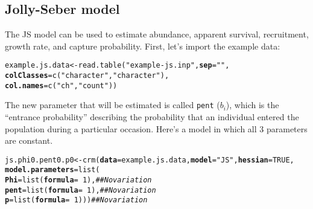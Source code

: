 \documentclass[12pt]{article}\usepackage[]{graphicx}\usepackage[]{color}
\makeatletter
\newcommand{\hlnum}[1]{\textcolor[rgb]{0.69,0.494,0}{#1}}%
\newcommand{\hlstr}[1]{\textcolor[rgb]{0.749,0.012,0.012}{#1}}%
\newcommand{\hlcom}[1]{\textcolor[rgb]{0.514,0.506,0.514}{\textit{#1}}}%
\newcommand{\hlopt}[1]{\textcolor[rgb]{0,0,0}{#1}}%
\newcommand{\hlstd}[1]{\textcolor[rgb]{0,0,0}{#1}}%
\newcommand{\hlkwb}[1]{\textcolor[rgb]{0,0.341,0.682}{#1}}%
\newcommand{\hlkwc}[1]{\textcolor[rgb]{0,0,0}{\textbf{#1}}}%
\newcommand{\hlkwd}[1]{\textcolor[rgb]{0.004,0.004,0.506}{#1}}%
\newenvironment{kframe}{%
 \def\at@end@of@kframe{}%
 \ifinner\ifhmode%
  \def\at@end@of@kframe{\end{minipage}}%
  \begin{minipage}{\columnwidth}%
 \fi\fi%
 \def\FrameCommand##1{\hskip\@totalleftmargin \hskip-\fboxsep
 \colorbox{shadecolor}{##1}\hskip-\fboxsep
     \hskip-\linewidth \hskip-\@totalleftmargin \hskip\columnwidth}%
 \MakeFramed {\advance\hsize-\width
   \@totalleftmargin\z@ \linewidth\hsize
   \@setminipage}}%
 {\par\unskip\endMakeFramed%
 \at@end@of@kframe}
\newenvironment{knitrout}{}{} %
\makeatother
\begin{document}
\clearpage

\subsection*{Jolly-Seber model}

The JS model can be used to estimate abundance, apparent survival,
recruitment, growth rate, and capture probability. First, let's import
the example data: 

\begin{knitrout}
\color{fgcolor}\begin{kframe}
\begin{alltt}
\hlstd{example.js.data} \hlkwb{<-} \hlkwd{read.table}\hlstd{(}\hlstr{"example-js.inp"}\hlstd{,} \hlkwc{sep}\hlstd{=}\hlstr{" "}\hlstd{,}
                              \hlkwc{colClasses}\hlstd{=}\hlkwd{c}\hlstd{(}\hlstr{"character"}\hlstd{,}\hlstr{"character"}\hlstd{),}
                              \hlkwc{col.names}\hlstd{=}\hlkwd{c}\hlstd{(}\hlstr{"ch"}\hlstd{,} \hlstr{"count"}\hlstd{))}
\end{alltt}
\end{kframe}
\end{knitrout}

The new parameter that will be estimated is called \texttt{pent} ($b_i$),
which is the ``entrance probability'' describing the probability that
an individual entered the population during a particular
occasion. Here's a model in which all 3 parameters are constant.


\begin{knitrout}
\color{fgcolor}\begin{kframe}
\begin{alltt}
\hlstd{js.phi0.pent0.p0} \hlkwb{<-} \hlkwd{crm}\hlstd{(}\hlkwc{data}\hlstd{=example.js.data,} \hlkwc{model}\hlstd{=}\hlstr{"JS"}\hlstd{,} \hlkwc{hessian}\hlstd{=}\hlnum{TRUE}\hlstd{,}
                        \hlkwc{model.parameters}\hlstd{=}\hlkwd{list}\hlstd{(}
                            \hlkwc{Phi}\hlstd{=}\hlkwd{list}\hlstd{(}\hlkwc{formula}\hlstd{=}\hlopt{~}\hlnum{1}\hlstd{),}   \hlcom{## No variation}
                            \hlkwc{pent}\hlstd{=}\hlkwd{list}\hlstd{(}\hlkwc{formula}\hlstd{=}\hlopt{~}\hlnum{1}\hlstd{),}  \hlcom{## No variation}
                            \hlkwc{p}\hlstd{=}\hlkwd{list}\hlstd{(}\hlkwc{formula}\hlstd{=}\hlopt{~}\hlnum{1}\hlstd{)))}    \hlcom{## No variation}
\end{alltt}
\end{kframe}
\end{knitrout}
\end{document}
